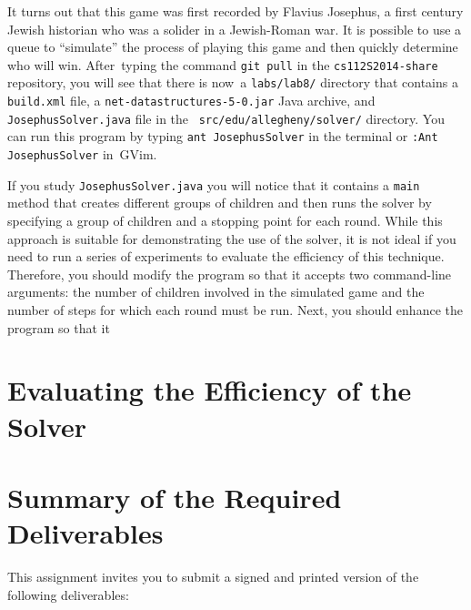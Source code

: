   It turns out that this game was first recorded by Flavius Josephus, a first century Jewish historian who was a solider
  in a Jewish-Roman war.  It is possible to use a queue to ``simulate'' the process of playing this game and then
  quickly determine who will win.  \mbox{After typing} the command {\tt git pull} in the {\tt cs112S2014-share}
  repository, you will see that there is \mbox{now a} {\tt labs/lab8/} directory that contains a {\tt build.xml} file, a
  {\tt net-datastructures-5-0.jar} Java archive, and {\tt JosephusSolver.java} file in the {\tt
    src/edu/allegheny/solver/} directory.  You can run this program by typing {\tt ant JosephusSolver} in the terminal
  or {\tt :Ant JosephusSolver} \mbox{in GVim}.

  If you study {\tt JosephusSolver.java} you will notice that it contains a {\tt main} method that creates different
  groups of children and then runs the solver by specifying a group of children and a stopping point for each round.
  While this approach is suitable for demonstrating the use of the solver, it is not ideal if you need to run a series
  of experiments to evaluate the efficiency of this technique. Therefore, you should modify the program so that it
  accepts two command-line arguments: the number of children involved in the simulated game and the number of steps for
  which each round must be run. Next, you should enhance the program so that it

\section*{Evaluating the Efficiency of the Solver}

\section*{Summary of the Required Deliverables}

  This assignment invites you to submit a signed and printed version of the following deliverables: 

